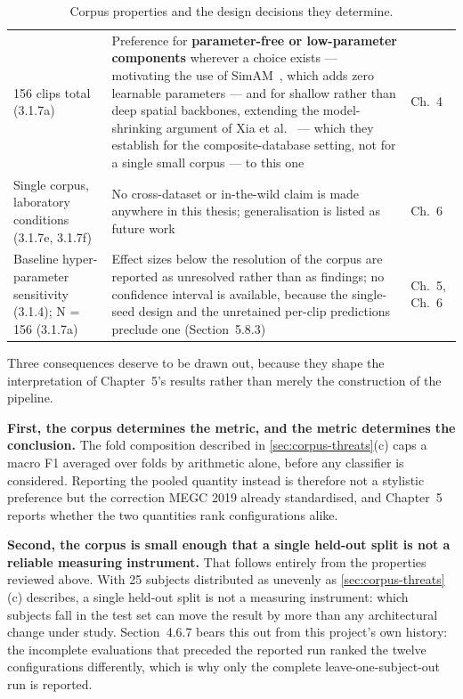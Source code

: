 \begin{table}[htbp]
\begin{tabular}{p{3.2cm} p{8.0cm} p{1.3cm}}
		156 clips total (3.1.7a) & Preference for \textbf{parameter-free or low-parameter components} wherever a choice exists --- motivating the use of SimAM~\cite{yang2021}, which adds zero learnable parameters --- and for shallow rather than deep spatial backbones, extending the model-shrinking argument of Xia et al.~\cite{xia2020b} --- which they establish for the composite-database setting, not for a single small corpus --- to this one & Ch.~4 \\
		Single corpus, laboratory conditions (3.1.7e, 3.1.7f) & No cross-dataset or in-the-wild claim is made anywhere in this thesis; generalisation is listed as future work & Ch.~6 \\
		Baseline hyper-parameter sensitivity (3.1.4); N = 156 (3.1.7a) & Effect sizes below the resolution of the corpus are reported as unresolved rather than as findings; no confidence interval is available, because the single-seed design and the unretained per-clip predictions preclude one (Section~5.8.3) & Ch.~5, Ch.~6 \\
		\hline
	\end{tabular}
	\caption[Corpus properties and the design decisions they determine]{Corpus properties and the design decisions they determine.}
	\label{tab:corpus-design-decisions}
\end{table}

Three consequences deserve to be drawn out, because they shape the interpretation of Chapter~5's results rather than merely the construction of the pipeline.

\textbf{First, the corpus determines the metric, and the metric determines the conclusion.} The fold composition described in \autoref{sec:corpus-threats}(c) caps a macro F1 averaged over folds by arithmetic alone, before any classifier is considered. Reporting the pooled quantity instead is therefore not a stylistic preference but the correction MEGC 2019 already standardised, and Chapter~5 reports whether the two quantities rank configurations alike.

\textbf{Second, the corpus is small enough that a single held-out split is not a reliable measuring instrument.} That follows entirely from the properties reviewed above. With 25 subjects distributed as unevenly as \autoref{sec:corpus-threats}(c) describes, a single held-out split is not a measuring instrument: which subjects fall in the test set can move the result by more than any architectural change under study. Section~4.6.7 bears this out from this project's own history: the incomplete evaluations that preceded the reported run ranked the twelve configurations differently, which is why only the complete leave-one-subject-out run is reported.

